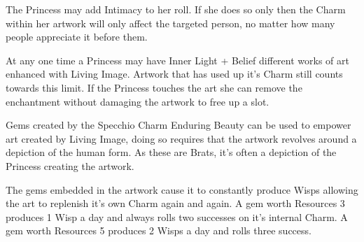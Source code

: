 The Princess may add Intimacy to her roll. If she does so only then the Charm within her artwork will only affect the targeted person, no matter how many people appreciate it before them. 

At any one time a Princess may have Inner Light + Belief different works of art enhanced with Living Image. Artwork that has used up it's Charm still counts towards this limit. If the Princess touches the art she can remove the enchantment without damaging the artwork to free up a slot. 

Gems created by the Specchio Charm Enduring Beauty can be used to empower art created by Living Image, doing so requires that the artwork revolves around a depiction of the human form. As these are Brats, it's often a depiction of the Princess creating the artwork. 

The gems embedded in the artwork cause it to constantly produce Wisps allowing the art to replenish it's own Charm again and again. A gem worth Resources 3 produces 1 Wisp a day and always rolls two successes on it's internal Charm. A gem worth Resources 5 produces 2 Wisps a day and rolls three success. 

